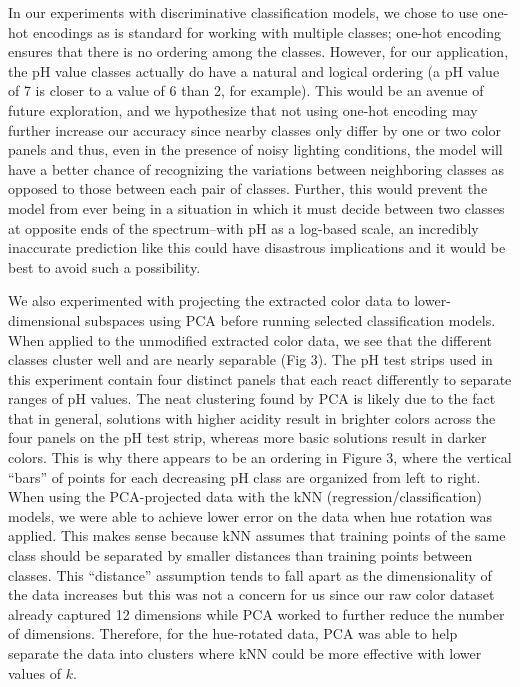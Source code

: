 \documentclass[journal]{IEEEtran}
\begin{document}
In our experiments with discriminative classification models, we chose to use one-hot encodings as is standard for working with multiple classes; one-hot encoding ensures that there is no ordering among the classes. However, for our application, the pH value classes actually do have a natural and logical ordering (a pH value of 7 is closer to a value of 6 than 2, for example). This would be an avenue of future exploration, and we hypothesize that not using one-hot encoding may further increase our accuracy since nearby classes only differ by one or two color panels and thus, even in the presence of noisy lighting conditions, the model will have a better chance of recognizing the variations between neighboring classes as opposed to those between each pair of classes. Further, this would prevent the model from ever being in a situation in which it must decide between two classes at opposite ends of the spectrum--with pH as a log-based scale, an incredibly inaccurate prediction like this could have disastrous implications and it would be best to avoid such a possibility.

We also experimented with projecting the extracted color data to lower-dimensional subspaces using PCA before running selected classification models. When applied to the unmodified extracted color data, we see that the different classes cluster well and are nearly separable (Fig 3). The pH test strips used in this experiment contain four distinct panels that each react differently to separate ranges of pH values. The neat clustering found by PCA is likely due to the fact that in general, solutions with higher acidity result in brighter colors across the four panels on the pH test strip, whereas more basic solutions result in darker colors. This is why there appears to be an ordering in Figure 3, where the vertical “bars” of points for each decreasing pH class are organized from left to right. When using the PCA-projected data with the kNN (regression/classification) models, we were able to achieve lower error on the data when hue rotation was applied. This makes sense because kNN assumes that training points of the same class should be separated by smaller distances than training points between classes. This “distance” assumption tends to fall apart as the dimensionality of the data increases but this was not a concern for us since our raw color dataset already captured 12 dimensions while PCA worked to further reduce the number of dimensions. Therefore, for the hue-rotated data, PCA was able to help separate the data into clusters where kNN could be more effective with lower values of $k$. 
\end{document}
